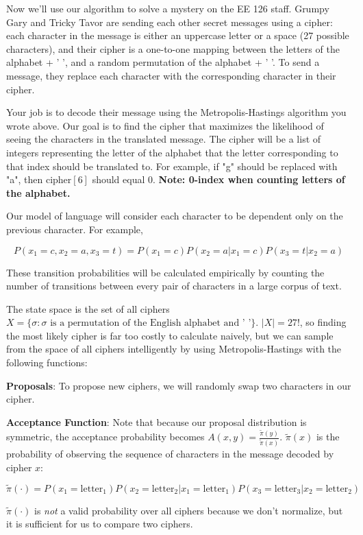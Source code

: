 \documentclass[11pt]{article}
\begin{document}
Now we'll use our algorithm to solve a mystery on the EE 126 staff.
Grumpy Gary and Tricky Tavor are sending each other secret messages
using a cipher: each character in the message is either an uppercase
letter or a space (27 possible characters), and their cipher is a
one-to-one mapping between the letters of the alphabet + ' ', and a
random permutation of the alphabet + ' '. To send a message, they
replace each character with the corresponding character in their cipher.

Your job is to decode their message using the Metropolis-Hastings
algorithm you wrote above. Our goal is to find the cipher that maximizes
the likelihood of seeing the characters in the translated message. The
cipher will be a list of integers representing the letter of the
alphabet that the letter corresponding to that index should be
translated to. For example, if "g" should be replaced with "a", then
\(\text{cipher}[6]\) should equal 0. \textbf{Note: 0-index when counting
letters of the alphabet.}

Our model of language will consider each character to be dependent only
on the previous character. For example,

\[P(x_1 = c, x_2 = a, x_3 = t) = P(x_1 = c)P(x_2 = a|x_1 = c)P(x_3 = t|x_2 = a)\]

These transition probabilities will be calculated empirically by
counting the number of transitions between every pair of characters in a
large corpus of text.

The state space is the set of all ciphers
\(X = \{\sigma : \sigma \text{ is a permutation of the English alphabet and '  '}\}\).
\(|X| = 27!\), so finding the most likely cipher is far too costly to
calculate naively, but we can sample from the space of all ciphers
intelligently by using Metropolis-Hastings with the following functions:

\textbf{Proposals}: To propose new ciphers, we will randomly swap two
characters in our cipher.

\textbf{Acceptance Function}: Note that because our proposal
distribution is symmetric, the acceptance probability becomes
\(A(x,y) = \frac{\widetilde{\pi}(y)}{\widetilde{\pi}(x)}\).
\(\widetilde{\pi}(x)\) is the probability of observing the sequence of
characters in the message decoded by cipher \(x\):

\[\widetilde{\pi}(\cdot) = P(x_1 = \text{letter}_1)P(x_2 = \text{letter}_2|x_1 = \text{letter}_1)P(x_3 = \text{letter}_3|x_2 = \text{letter}_2)\]

\(\widetilde{\pi}(\cdot)\) is \emph{not} a valid probability over all
ciphers because we don't normalize, but it is sufficient for us to
compare two ciphers.
\end{document}
